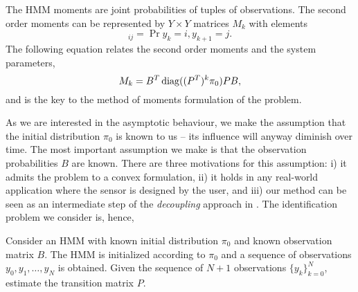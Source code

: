 \documentclass[journal]{IEEEtran}
\begin{document}
The HMM moments are joint probabilities of tuples of observations. The second
order moments can be represented by $Y \times Y$ matrices $M_k$ with elements
\begin{equation}
    [M_k]_{ij} = \Pr{y_{k} = i, y_{k+1} = j}.
    \label{eq:Mk_def}
\end{equation}
The following equation relates the second order moments and the system
parameters,
\begin{equation}
    M_k = B^T \operatorname{diag}((P^T)^k \pi_0) PB,
    \label{eq:2nd_moments}
\end{equation}
and is the key to the method of moments formulation of the problem.

As we are interested in the asymptotic behaviour, we make the assumption that the initial
distribution $\pi_0$ is known to us -- its influence will anyway diminish over time. The
most important assumption we make is that the observation probabilities $B$ are known.
There are three motivations for this assumption: i) it admits the problem to a convex
formulation, ii) it holds in any real-world application where the sensor is designed by
the user, and iii) our method can be seen as an intermediate step of the \emph{decoupling}
approach in \cite{kontorovich_learning_2013}.  The identification problem we consider is,
hence,
\begin{problem}
    Consider an HMM with known initial distribution $\pi_0$ and known observation matrix
    $B$. The HMM is initialized according to $\pi_0$ and a sequence of observations $y_0,
    y_1, \dots, y_N$ is obtained. Given the sequence of $N+1$ observations
    $\{y_k\}_{k=0}^N$, estimate the transition matrix $P$.
    \label{pr:problem3}
\end{problem}


\end{document}
